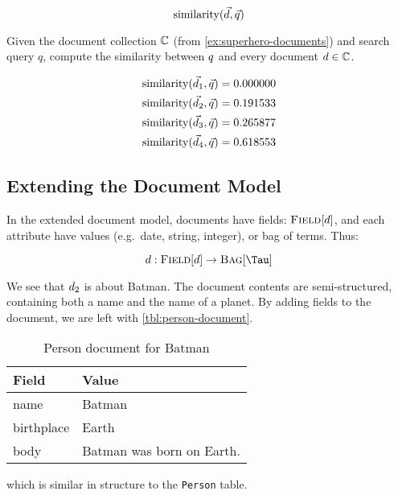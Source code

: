 		\[
			\operatorname{similarity}(\vec{d}, \vec{q})
		\]
		
		\begin{ex}
			Given the document collection \(\mathbb{C}\) (from \vref{ex:superhero-documents}) and search query \(q\), compute the similarity between \(q\) and every document \(d \in \mathbb{C}\).
			
			\begin{align}
				\operatorname{similarity}(\vec{d}_1, \vec{q}) &= 0.000000 \\
				\operatorname{similarity}(\vec{d}_2, \vec{q}) &= 0.191533 \\
				\operatorname{similarity}(\vec{d}_3, \vec{q}) &= 0.265877 \\
				\operatorname{similarity}(\vec{d}_4, \vec{q}) &= 0.618553
			\end{align}
		\end{ex}
		
	\subsection{Extending the Document Model}
	\label{sec:extending-the-document-model}
		In the extended document model, documents have fields: \(\textsc{Field}[d]\), and each attribute have values (e.g.~date, string, integer), or bag of terms.  Thus:

		\[
			\doc : \fields{\doc} \to \bag{\terms}
		\]
		
		\begin{ex}
			We see that \(d_2\) is about Batman.  The document contents are semi-structured, containing both a name and the name of a planet.	By adding fields to the document, we are left with \vref{tbl:person-document}.
			
			\begin{table}[!ht]
				\centering
				
				\begin{tabular}{ll}
					\toprule
					Field & Value \\
					\midrule
					name & Batman \\
					birthplace & Earth \\
					body & Batman was born on Earth. \\
					\bottomrule
				\end{tabular}
				
				\caption{Person document for Batman}
				\label{tbl:person-document}
			\end{table}
			
			which is similar in structure to the \texttt{Person} table. 
		\end{ex}
		

